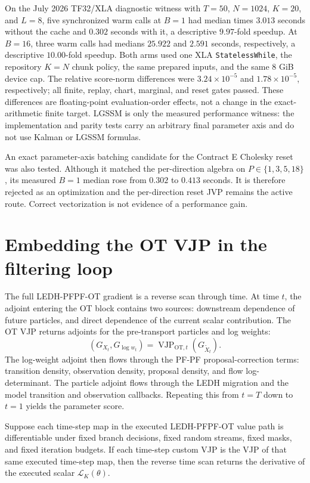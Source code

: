 On the July 2026 TF32/XLA diagnostic witness with \(T=50\), \(N=1024\),
\(K=20\), and \(L=8\), five synchronized warm calls at \(B=1\) had median
times \(3.013\) seconds without the cache and \(0.302\) seconds with it, a
descriptive \(9.97\)-fold speedup.  At \(B=16\), three warm calls had medians
\(25.922\) and \(2.591\) seconds, respectively, a descriptive
\(10.00\)-fold speedup.  Both arms used one XLA \texttt{StatelessWhile}, the
repository \(K=N\) chunk policy, the same prepared inputs, and the same 8 GiB
device cap.  The relative score-norm differences were \(3.24\times10^{-5}\)
and \(1.78\times10^{-5}\), respectively; all finite, replay, chart, marginal,
and reset gates passed.  These differences are floating-point evaluation-order
effects, not a change in the exact-arithmetic finite target.  LGSSM is only the
measured performance witness: the implementation and parity tests carry an
arbitrary final parameter axis and do not use Kalman or LGSSM formulas.

An exact parameter-axis batching candidate for the Contract E Cholesky reset
was also tested.  Although it matched the per-direction algebra on
\(P\in\{1,3,5,18\}\), its measured \(B=1\) median rose from \(0.302\) to
\(0.413\) seconds.  It is therefore rejected as an optimization and the
per-direction reset JVP remains the active route.  Correct vectorization is not
evidence of a performance gain.

\section{Embedding the OT VJP in the filtering loop}
\label{sec:bf-ledh-ot-filter-loop}

The full LEDH-PFPF-OT gradient is a reverse scan through time.  At time \(t\),
the adjoint entering the OT block contains two sources: downstream dependence
of future particles, and direct dependence of the current scalar contribution.
The OT VJP returns adjoints for the pre-transport particles and log weights:
\[
  (G_{X_t},G_{\log w_t})
  =
  \operatorname{VJP}_{\mathrm{OT},t}
  (G_{\widetilde X_t}).
\]
The log-weight adjoint then flows through the PF-PF proposal-correction terms:
transition density, observation density, proposal density, and flow
log-determinant.  The particle adjoint flows through the LEDH migration and the
model transition and observation callbacks.  Repeating this from \(t=T\) down
to \(t=1\) yields the parameter score.

\begin{proposition}
\label{prop:bf-ledh-ot-filtering-loop-vjp}
Suppose each time-step map in the executed LEDH-PFPF-OT value path is
differentiable under fixed branch decisions, fixed random streams, fixed masks,
and fixed iteration budgets.  If each time-step custom VJP is the VJP of that
same executed time-step map, then the reverse time scan returns the derivative
of the executed scalar \(\mathcal L_K(\theta)\).
\end{proposition}

